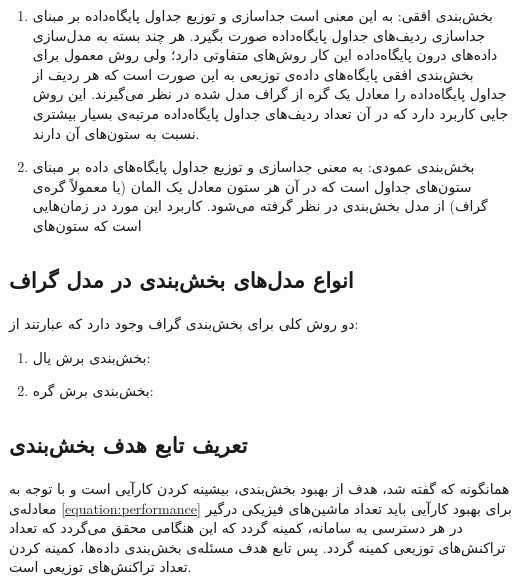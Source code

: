 \begin{enumerate}
	\item
بخش‌بندی افقی: به این معنی است جداسازی و توزیع جداول پایگاه‌داده بر مبنای جداسازی ردیف‌های جداول پایگاه‌داده صورت بگیرد. هر چند بسته به مدل‌سازی داده‌های درون پایگاه‌داده این کار روش‌های متفاوتی دارد؛ ولی روش معمول برای بخش‌بندی افقی پایگاه‌های داده‌ی توزیعی به این صورت است که هر ردیف از جداول پایگاه‌داده را معادل یک گره از گراف مدل شده در نظر می‌گیرند. این روش جایی کاربرد دارد که در آن تعداد ردیف‌های جداول پایگاه‌داده مرتبه‌ی بسیار بیشتری نسبت به ستون‌های آن دارند.
	\item
بخش‌بندی عمودی: به معنی جداسازی و توزیع جداول پایگاه‌های داده بر مبنای ستون‌های جداول است که در آن هر ستون معادل یک المان (یا معمولاً گره‌ی گراف) از مدل بخش‌بندی در نظر گرفته می‌شود. کاربرد این مورد در زمان‌هایی است که ستون‌های 
\end{enumerate}

\subsection{انواع مدل‌های بخش‌بندی در مدل گراف}

\paragraph{}
دو روش کلی برای بخش‌بندی گراف وجود دارد که عبارتند از:
\cite{rahimian-2014}

\begin{enumerate}
	\item
بخش‌بندی برش یال:
	\item
بخش‌بندی برش گره:
\end{enumerate}

\subsection{تعریف تابع هدف بخش‌بندی}

\paragraph*{}
همانگونه که گفته شد، هدف از بهبود بخش‌بندی، بیشینه کردن کارآیی است و با توجه به معادله‌ی
\ref{equation:performance}
برای بهبود کارآیی باید تعداد ماشین‌های فیزیکی درگیر در هر دسترسی به سامانه، کمینه گردد که این هنگامی محقق می‌گردد که تعداد تراکنش‌های توزیعی کمینه گردد. پس تابع هدف مسئله‌ی بخش‌بندی داده‌ها، کمینه کردن تعداد تراکنش‌های توزیعی است.

